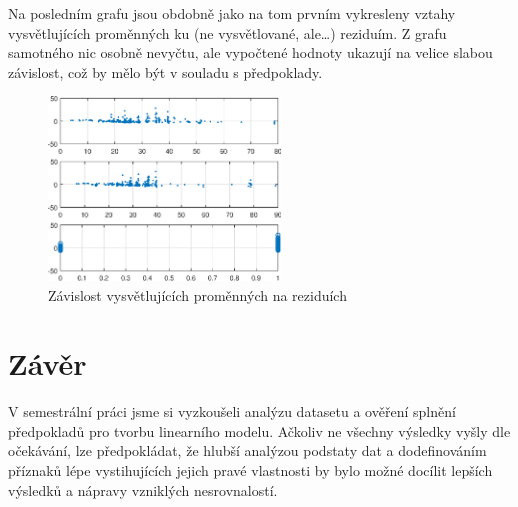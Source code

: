 Na posledním grafu jsou obdobně jako na tom prvním vykresleny vztahy vysvětlujících proměnných ku (ne vysvětlované, ale\ldots) reziduím.
Z grafu samotného nic osobně nevyčtu, ale vypočtené hodnoty ukazují na velice slabou závislost, což by mělo být v souladu s předpoklady.

\begin{figure}[htb]
    \centering
    \includegraphics[width=0.55\textwidth]{graphs/fig5.eps}
    \caption{Závislost vysvětlujících proměnných na reziduích}
    \label{fig:lr5}
\end{figure}
\FloatBarrier

\section{Závěr}

V semestrální práci jsme si vyzkoušeli analýzu datasetu a ověření splnění předpokladů pro tvorbu linearního modelu.
Ačkoliv ne všechny výsledky vyšly dle očekávání, lze předpokládat, že hlubší analýzou podstaty dat a dodefinováním příznaků lépe vystihujících jejich pravé vlastnosti by bylo možné docílit lepších výsledků a nápravy vzniklých nesrovnalostí.
